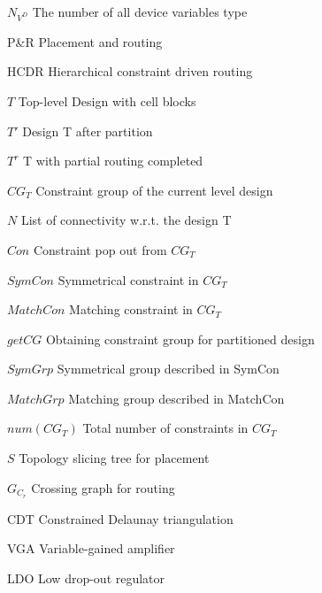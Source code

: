 \begin{SymEntry}
\item[$N_{V^D}$]
The number of all device variables type

\item[P\&R]
Placement and routing

\item[HCDR]
Hierarchical constraint driven routing

\item[$T$]
Top-level Design with cell blocks

\item[$T'$]
Design T after partition  

\item[$T^r$]
T with partial routing completed

\item[$CG_T$]
Constraint group of the current level design

\item[$N$]
List of connectivity w.r.t. the design T

\item[$Con  $]
Constraint pop out from $CG_T$

\item[$SymCon$]
Symmetrical constraint in $CG_T$

\item[$MatchCon$]
Matching constraint in $CG_T$

\item[$getCG$]
Obtaining constraint group for partitioned design

\item[$SymGrp$]
Symmetrical group described in SymCon

\item[$MatchGrp$]
Matching group described in MatchCon

\item[$num(CG_T)$]
Total number of constraints in $CG_T$

\item[$S$]
Topology slicing tree for placement

\item[$G_{C_r}$]
Crossing graph for routing 

\item[CDT]
Constrained Delaunay triangulation

\item[VGA]
Variable-gained amplifier

\item[LDO]
Low drop-out regulator


\end{SymEntry}
